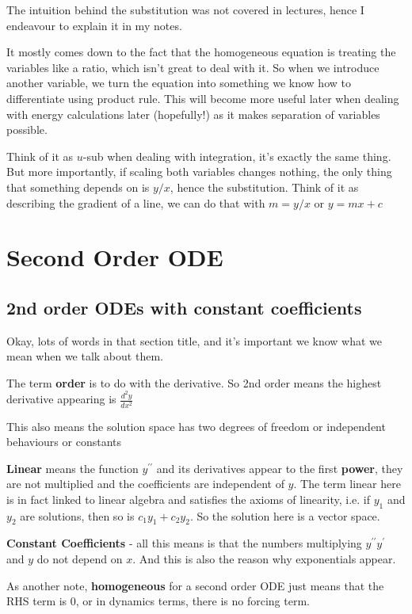 The intuition behind the substitution was not covered in lectures, hence I endeavour to explain it in my notes. 

It mostly comes down to the fact that the homogeneous equation is treating the variables like a ratio, which isn't great to deal with it. So when we introduce another variable, we turn the equation into something we know how to differentiate using product rule. This will become more useful later when dealing with energy calculations later (hopefully!) as it makes separation of variables possible. 

Think of it as $u$-sub when dealing with integration, it's exactly the same thing. But more importantly, if scaling both variables changes nothing, the only thing that something depends on is $y/x$, hence the substitution. Think of it as describing the gradient of a line, we can do that with $m = y/x$ or $y = mx +c$ 

\chapter{Second Order ODE}


\section{2nd order ODEs with constant coefficients}

Okay, lots of words in that section title, and it's important we know what we mean when we talk about them. 

The term \textbf{order} is to do with the derivative. So 2nd order means the highest derivative appearing is $\frac{d^2y}{dx^2}$

This also means the solution space has two degrees of freedom or independent behaviours or constants 

\textbf{Linear} means the function $y^{\prime \prime}$ and its derivatives appear to the first \textbf{power}, they are not multiplied and the coefficients are independent of $y$. The term linear here is in fact linked to linear algebra and satisfies the axioms of linearity, i.e. if $y_1$ and $y_2$ are solutions, then so is $c_1y_1 + c_2 y_2$. So the solution here is a vector space. 

\textbf{Constant Coefficients} - all this means is that the numbers multiplying $y^{\prime \prime} y^{\prime}$ and $y$ do not depend on $x$. And this is also the reason why exponentials appear. 

As another note, \textbf{homogeneous} for a second order ODE just means that the RHS term is $0$, or in dynamics terms, there is no forcing term. 

